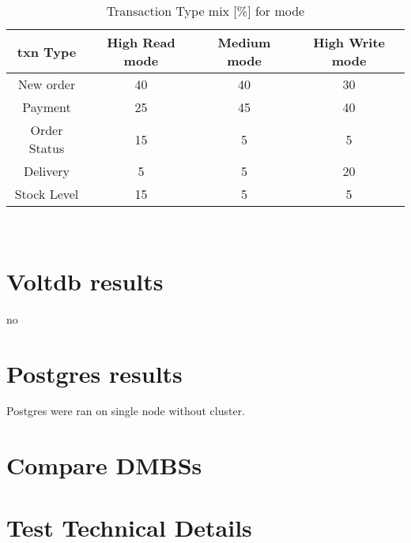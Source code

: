 \documentclass{article}
\begin{document}
    \begin{table}
        \begin{center}
            \begin{tabular}{ |c|c|c|c| } 
                \hline
                txn Type & High Read mode & Medium mode & High Write mode\\
                \hline
                New order & 40 & 40 & 30 \\
                Payment & 25 & 45 & 40 \\
                Order Status & 15 & 5 & 5 \\
                Delivery & 5 & 5 & 20 \\
                Stock Level & 15 & 5 & 5 \\
                \hline
            \end{tabular}
            \\[1pt]
            \caption{Transaction Type mix [\%] for mode}
        \end{center}
    \end{table}

    \pagebreak

\section{Voltdb results}
    no
    
    

\section{Postgres results}
    Postgres were ran on single node without cluster.\\
    
    

\section{Compare DMBSs}
    

\section{Test Technical Details}
    


\end{document}
